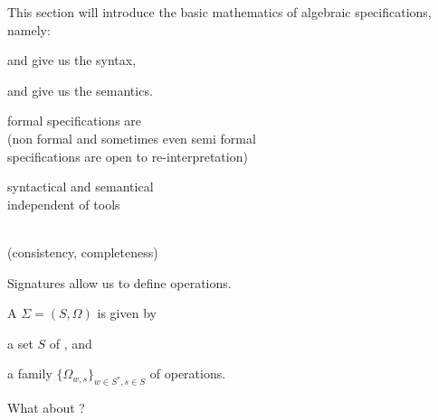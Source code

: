 \documentclass[landscape, slides, light]{mmiss}
\begin{document}
\begin{Package}[Label=AlgSpec,
  Title={Formal Program Development with Algebraic Specifications},
  Date=12.09.2002,
  Authors={Christoph L{\"u}th, Markus Roggenbach},
  PriorAuthors={Markus Roggenbach, Michael Drouineaud},
  ShortAuthors={C.~L{\"u}th, M.~Roggenbach},
  ShortTitle={Algebraic Specification},
  Language=en-GB,LevelOfDetail=Lecture,InteractionLevel=Hyper]

\begin{Section}[Label=IntroAlgSpec, Title={Signatures, Terms and Algebras}]

\begin{Abstract}[Label=Abstract, Title=Overview]
This section will introduce the basic mathematics of algebraic
specifications, namely:
\begin{Enumerate}
  \item {} and  give us the syntax,
  \item and  give us the semantics.
\end{Enumerate}  
\end{Abstract}

\begin{Introduction}[Label=Intro, Title={Why Formal Specification?}]
\begin{Itemize}
\item
formal specifications are   \\
(non formal and sometimes even semi formal \\
specifications are open to re-interpretation)\pause
\item
syntactical and semantical  \\ 
independent of tools 
\pause
\item{}
 \\
(consistency, completeness)
\end{Itemize}
\end{Introduction}


\begin{Paragraph}[Label=Signatures, Title=Signatures]
Signatures allow us to define operations.
\vspace{1cm}

\begin{Definition}[Label=DefSignature, Title=Signature]
A  $\Sigma=(S, \Omega)$ is given by 
\begin{Itemize}
    \item a set $S$ of , and 
    \item a family $\{\Omega_{w,s}\}_{w\in S^{*},s\in S}$ of operations. 
  \end{Itemize}
What about ?
\end{Definition}


\end{Paragraph}
\end{Section}
\end{Package}
\end{document}
